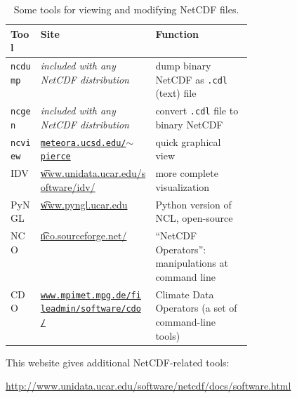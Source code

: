 \newcommand{\netcdftool}[1]{#1\index{NetCDF!tools!#1}}
\begin{table}[ht]
\centering
\caption{Some tools for viewing and modifying NetCDF files.}\label{tab:NetCDFview} 
\small
\begin{tabular}{llp{0.4\linewidth}}
  \\\toprule
  \textbf{Tool} & \textbf{Site} & \textbf{Function}\\ \midrule
\netcdftool{\texttt{ncdump}} & \emph{included with any NetCDF distribution} & dump binary NetCDF as \texttt{.cdl} (text) file \\
\netcdftool{\texttt{ncgen}} & \emph{included with any NetCDF distribution} & convert \texttt{.cdl} file to binary NetCDF \\
\netcdftool{\texttt{ncview}} & \href{http://meteora.ucsd.edu/~pierce/ncview_home_page.html}{\texttt{meteora.ucsd.edu/$\sim$pierce}} & quick graphical view \\
\netcdftool{IDV} & \href{http://www.unidata.ucar.edu/software/idv/}{\t{www.unidata.ucar.edu/software/idv/}} & more complete visualization \\
\netcdftool{PyNGL} &  \href{http://www.pyngl.ucar.edu}{\t{www.pyngl.ucar.edu}} & Python version of NCL, open-source\\
\netcdftool{NCO}\index{NCO (NetCDF Operators)} & \href{http://nco.sourceforge.net/}{\t{nco.sourceforge.net/}} & ``NetCDF Operators'': manipulations at command line\\
\netcdftool{CDO} & \href{http://www.mpimet.mpg.de/fileadmin/software/cdo/}{\texttt{www.mpimet.mpg.de/fileadmin/software/cdo/}} & Climate Data Operators (a set of command-line tools)
\\\bottomrule
\end{tabular}
\normalsize
\end{table}

This website gives additional NetCDF-related tools:

\centerline{ \url{http://www.unidata.ucar.edu/software/netcdf/docs/software.html} } 



